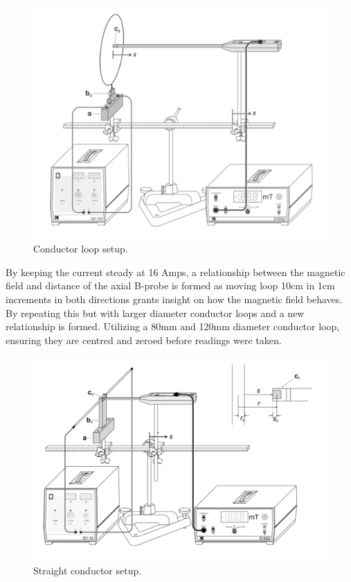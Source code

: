 \documentclass[12pt]{article}
\begin{document}
\begin{figure}[H]
\centering
\includegraphics[scale=0.4]{Images/CL.png}
\caption{Conductor loop setup. \cite{Exp.5-2019}}
\label{CL setup}
\end{figure}

By keeping the current steady at 16 Amps, a relationship between the magnetic field and distance of the axial B-probe is formed as moving loop 10cm in 1cm increments in both directions grants insight on how the magnetic field behaves. By repeating this but with larger diameter conductor loops and a new relationship is formed. Utilizing a 80mm and 120mm diameter conductor loop, ensuring they are centred and zeroed before readings were taken. \\

\begin{figure}[H]
\centering
\includegraphics[scale=0.4]{Images/SC.png}
\caption{Straight conductor setup. \cite{Exp.5-2019}}
\label{SC setup}
\end{figure}
\end{document}
